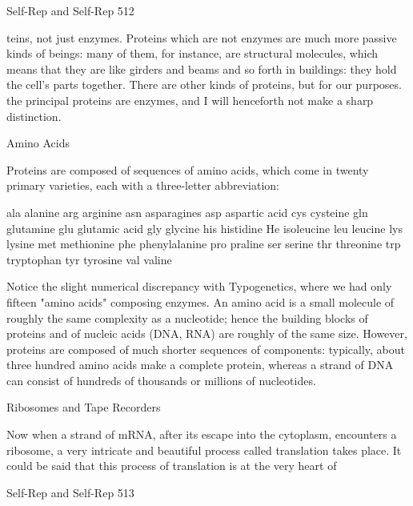 {Self-Rep and Self-Rep                                                                       512

teins, not just enzymes. Proteins which are not enzymes are much more passive kinds of
beings: many of them, for instance, are structural molecules, which means that they are like
girders and beams and so forth in buildings: they hold the cell's parts together. There are
other kinds of proteins, but for our purposes. the principal proteins are enzymes, and I will
henceforth not make a sharp distinction.

                                        Amino Acids

Proteins are composed of sequences of amino acids, which come in twenty primary varieties,
each with a three-letter abbreviation:

                 ala    alanine
                 arg    arginine
                 asn    asparagines
                 asp    aspartic acid
                 cys    cysteine
                 gln    glutamine
                 glu    glutamic acid
                 gly    glycine
                 his    histidine
                 He     isoleucine
                 leu    leucine
                 lys    lysine
                 met    methionine
                 phe    phenylalanine
                 pro    praline
                 ser    serine
                 thr    threonine
                 trp    tryptophan
                 tyr    tyrosine
                 val    valine

Notice the slight numerical discrepancy with Typogenetics, where we had only fifteen
"amino acids" composing enzymes. An amino acid is a small molecule of roughly the same
complexity as a nucleotide; hence the building blocks of proteins and of nucleic acids (DNA,
RNA) are roughly of the same size. However, proteins are composed of much shorter
sequences of components: typically, about three hundred amino acids make a complete
protein, whereas a strand of DNA can consist of hundreds of thousands or millions of
nucleotides.

                              Ribosomes and Tape Recorders

Now when a strand of mRNA, after its escape into the cytoplasm, encounters a ribosome, a
very intricate and beautiful process called translation takes place. It could be said that this
process of translation is at the very heart of




Self-Rep and Self-Rep                                                                      513

}
